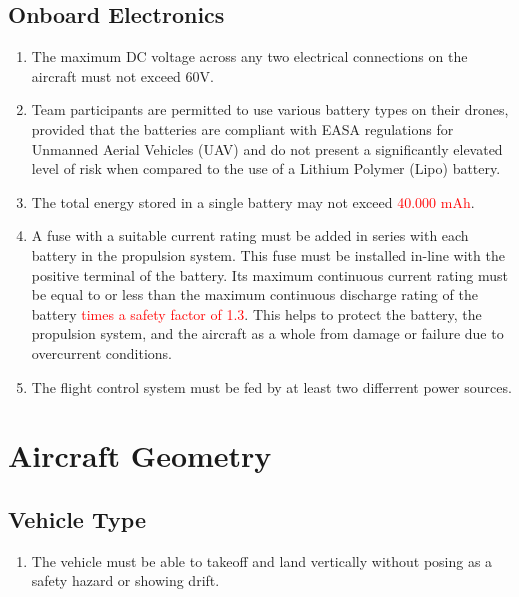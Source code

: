 \documentclass{article}
\begin{document}
\subsection{Onboard Electronics}
\begin{enumerate}
  \item The maximum DC voltage across any two electrical connections on the aircraft must not exceed 60V.
  \item Team participants are permitted to use various battery types on their drones, provided that the batteries are compliant with EASA regulations for Unmanned Aerial Vehicles (UAV) and do not present a significantly elevated level of risk when compared to the use of a Lithium Polymer (Lipo) battery. 
  \item The total energy stored in a single battery may not exceed \textcolor{red}{40.000 mAh}.
  \item A fuse with a suitable current rating must be added in series with each battery in the propulsion system. 
  This fuse must be installed in-line with the positive terminal of the battery. Its maximum continuous current rating must be equal to or less than the maximum continuous discharge rating of the battery \textcolor{red}{times a safety factor of 1.3}. This helps to protect the battery, the propulsion system, and the aircraft as a whole from damage or failure due to overcurrent conditions.
  \item The flight control system must be fed by at least two differrent power sources. 
\end{enumerate}



\section{Aircraft Geometry}

\subsection{Vehicle Type}
\begin{enumerate}
  \item The vehicle must be able to takeoff and land vertically without posing as a safety hazard or showing drift.  
\end{enumerate}
\end{document}
